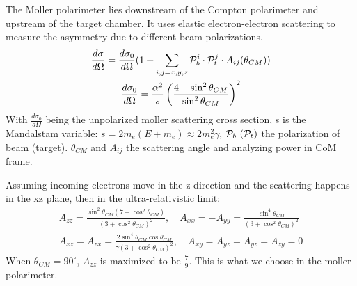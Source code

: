 The Moller polarimeter lies downstream of the Compton polarimeter and upstream 
of the target chamber. It uses elastic electron-electron scattering to measure the
asymmetry due to different beam polarizations. 
\begin{equation}
    \begin{gathered}
	\frac{d\sigma}{d\Omega} = \frac{d\sigma_0}{d\Omega} (1 + \sum_{i,j=x,y,z} \mathcal{P}_b^i \cdot \mathcal{P}_t^j \cdot A_{ij}(\theta_{CM})) \\
	\frac{d\sigma_0}{d\Omega} = \frac{\alpha^2}{s} \left( \frac{4 - \sin^2\theta_{CM}}{\sin^2\theta_{CM}}\right)^2 
    \end{gathered}
    \label{eqn:moller_xsection}
\end{equation}
With $\frac{d\sigma_0}{d\Omega}$ being the unpolarized moller scattering cross section,
s is the Mandalstam variable: $s = 2m_e(E+m_e) \approx 2m_e^2\gamma$,
$\mathcal{P}_b \ (\mathcal{P}_t)$ the polarization of beam (target). 
$\theta_{CM}$ and $A_{ij}$ the scattering angle and analyzing power in CoM frame. 

Assuming incoming electrons move in the z direction and the scattering happens
in the xz plane, then in the ultra-relativistic limit:
\begin{equation}
    \begin{gathered}
	A_{zz} = \frac{\sin^2\theta_{CM} (7 + \cos^2\theta_{CM})}{(3+\cos^2\theta_{CM})^2},
	\quad
	A_{xx} = -A_{yy} = \frac{\sin^4\theta_{CM}}{(3+\cos^2\theta_{CM})^2}	\\
	A_{xz} = A_{zx} = \frac{2\sin^4\theta_{CM}\cos\theta_{CM}}{\gamma(3+\cos^2\theta_{CM})^2},
	\quad
	A_{xy} = A_{yz} = A_{yz} = A_{zy} = 0
    \end{gathered}
\end{equation}
When $\theta_{CM} = 90^\circ$, $A_{zz}$ is maximized to be $\frac{7}{9}$. This
is what we choose in the moller polarimeter.

